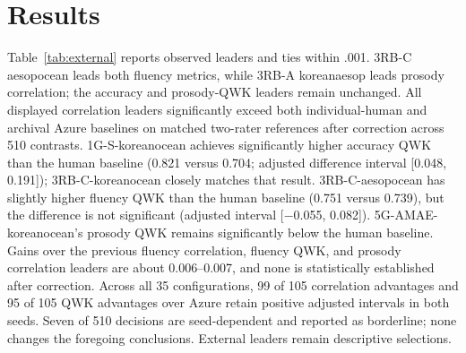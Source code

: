 \documentclass[10pt]{article}
\begin{document}
\section{Results}
Table~\ref{tab:external} reports observed leaders and ties within .001. 3RB-C aesopocean leads both fluency metrics, while 3RB-A koreanaesop leads prosody correlation; the accuracy and prosody-QWK leaders remain unchanged. All displayed correlation leaders significantly exceed both individual-human and archival Azure baselines on matched two-rater references after correction across 510 contrasts. 1G-S-koreanocean achieves significantly higher accuracy QWK than the human baseline (0.821 versus 0.704; adjusted difference interval [0.048, 0.191]); 3RB-C-koreanocean closely matches that result. 3RB-C-aesopocean has slightly higher fluency QWK than the human baseline (0.751 versus 0.739), but the difference is not significant (adjusted interval [$-$0.055, 0.082]). 5G-AMAE-koreanocean's prosody QWK remains significantly below the human baseline. Gains over the previous fluency correlation, fluency QWK, and prosody correlation leaders are about 0.006--0.007, and none is statistically established after correction. Across all 35 configurations, 99 of 105 correlation advantages and 95 of 105 QWK advantages over Azure retain positive adjusted intervals in both seeds. Seven of 510 decisions are seed-dependent and reported as borderline; none changes the foregoing conclusions. External leaders remain descriptive selections.
\end{document}

